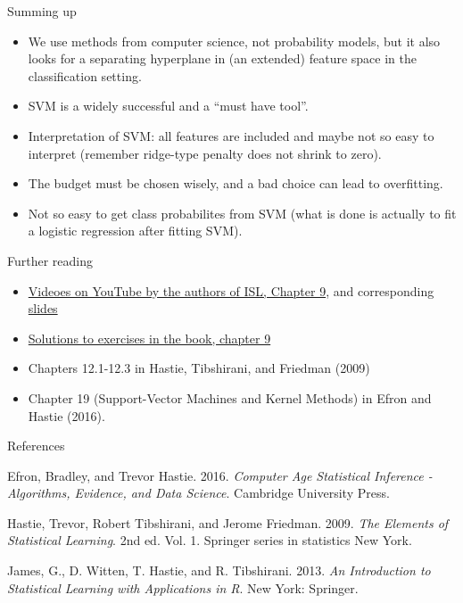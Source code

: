 \documentclass[10pt,ignorenonframetext,]{beamer}
\begin{document}
\begin{frame}{Summing up}
\protect\hypertarget{summing-up}{}

\begin{itemize}
\item
  We use methods from computer science, not probability models, but it
  also looks for a separating hyperplane in (an extended) feature space
  in the classification setting.
\item
  SVM is a widely successful and a ``must have tool''.
\item
  Interpretation of SVM: all features are included and maybe not so easy
  to interpret (remember ridge-type penalty does not shrink to zero).
\item
  The budget must be chosen wisely, and a bad choice can lead to
  overfitting.
\item
  Not so easy to get class probabilites from SVM (what is done is
  actually to fit a logistic regression after fitting SVM).
\end{itemize}

\end{frame}

\begin{frame}{Further reading}
\protect\hypertarget{further-reading}{}

\begin{itemize}
\item
  \href{https://www.youtube.com/playlist?list=PL5-da3qGB5IDl6MkmovVdZwyYOhpCxo5o}{Videoes
  on YouTube by the authors of ISL, Chapter 9}, and corresponding
  \href{https://lagunita.stanford.edu/c4x/HumanitiesScience/StatLearning/asset/svm.pdf}{slides}
\item
  \href{https://rpubs.com/ppaquay/65566}{Solutions to exercises in the
  book, chapter 9}
\item
  Chapters 12.1-12.3 in Hastie, Tibshirani, and Friedman (2009)
\item
  Chapter 19 (Support-Vector Machines and Kernel Methods) in Efron and
  Hastie (2016).
\end{itemize}

\end{frame}

\begin{frame}{References}
\protect\hypertarget{references}{}

\hypertarget{refs}{}
\leavevmode\hypertarget{ref-casi}{}%
Efron, Bradley, and Trevor Hastie. 2016. \emph{Computer Age Statistical
Inference - Algorithms, Evidence, and Data Science}. Cambridge
University Press.

\leavevmode\hypertarget{ref-ESL}{}%
Hastie, Trevor, Robert Tibshirani, and Jerome Friedman. 2009. \emph{The
Elements of Statistical Learning}. 2nd ed. Vol. 1. Springer series in
statistics New York.

\leavevmode\hypertarget{ref-james.etal}{}%
James, G., D. Witten, T. Hastie, and R. Tibshirani. 2013. \emph{An
Introduction to Statistical Learning with Applications in R}. New York:
Springer.

\end{frame}
\end{document}
